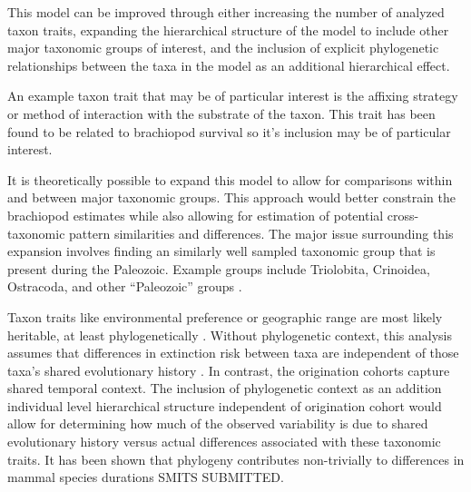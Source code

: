 \documentclass[12pt,letterpaper]{article}
\begin{document}
This model can be improved through either increasing the number of analyzed taxon traits, expanding the hierarchical structure of the model to include other major taxonomic groups of interest, and the inclusion of explicit phylogenetic relationships between the taxa in the model as an additional hierarchical effect.

An example taxon trait that may be of particular interest is the affixing strategy or method of interaction with the substrate of the taxon. This trait has been found to be related to brachiopod survival \citep{Alexander1977} so it's inclusion may be of particular interest.

It is theoretically possible to expand this model to allow for comparisons within and between major taxonomic groups. This approach would better constrain the brachiopod estimates while also allowing for estimation of potential cross-taxonomic pattern similarities and differences. The major issue surrounding this expansion involves finding an similarly well sampled taxonomic group that is present during the Paleozoic. Example groups include Triolobita, Crinoidea, Ostracoda, and other ``Paleozoic'' groups \citep{SepkoskiJr.1981a}.

Taxon traits like environmental preference or geographic range \citep{Jablonski1987,Hunt2005b} are most likely heritable, at least phylogenetically \citep{Lynch1991,Housworth2004}. Without phylogenetic context, this analysis assumes that differences in extinction risk between taxa are independent of those taxa's shared evolutionary history \citep{Felsenstein1985b}. In contrast, the origination cohorts capture shared temporal context. The inclusion of phylogenetic context as an addition individual level hierarchical structure independent of origination cohort would allow for determining how much of the observed variability is due to shared evolutionary history versus actual differences associated with these taxonomic traits. It has been shown that phylogeny contributes non-trivially to differences in mammal species durations \uppercase{Smits Submitted}.

\end{document}
